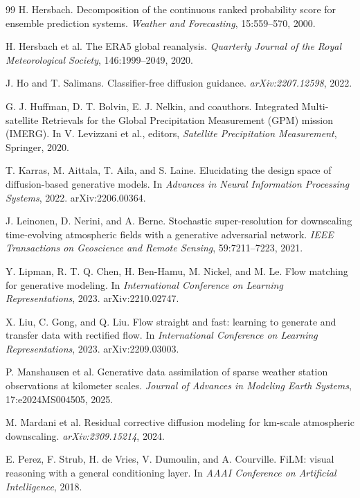 \documentclass[10pt,twocolumn]{article}
\begin{document}
\begin{thebibliography}{99}
H. Hersbach.
Decomposition of the continuous ranked probability score for ensemble prediction systems.
\emph{Weather and Forecasting}, 15:559--570, 2000.

H. Hersbach et al.
The ERA5 global reanalysis.
\emph{Quarterly Journal of the Royal Meteorological Society}, 146:1999--2049, 2020.

J. Ho and T. Salimans.
Classifier-free diffusion guidance.
\emph{arXiv:2207.12598}, 2022.

G. J. Huffman, D. T. Bolvin, E. J. Nelkin, and coauthors.
Integrated Multi-satellite Retrievals for the Global Precipitation Measurement (GPM) mission (IMERG).
In V. Levizzani et al., editors, \emph{Satellite Precipitation Measurement}, Springer, 2020.

T. Karras, M. Aittala, T. Aila, and S. Laine.
Elucidating the design space of diffusion-based generative models.
In \emph{Advances in Neural Information Processing Systems}, 2022.
arXiv:2206.00364.

J. Leinonen, D. Nerini, and A. Berne.
Stochastic super-resolution for downscaling time-evolving atmospheric fields with a generative adversarial network.
\emph{IEEE Transactions on Geoscience and Remote Sensing}, 59:7211--7223, 2021.

Y. Lipman, R. T. Q. Chen, H. Ben-Hamu, M. Nickel, and M. Le.
Flow matching for generative modeling.
In \emph{International Conference on Learning Representations}, 2023.
arXiv:2210.02747.

X. Liu, C. Gong, and Q. Liu.
Flow straight and fast: learning to generate and transfer data with rectified flow.
In \emph{International Conference on Learning Representations}, 2023.
arXiv:2209.03003.

P. Manshausen et al.
Generative data assimilation of sparse weather station observations at kilometer scales.
\emph{Journal of Advances in Modeling Earth Systems}, 17:e2024MS004505, 2025.

M. Mardani et al.
Residual corrective diffusion modeling for km-scale atmospheric downscaling.
\emph{arXiv:2309.15214}, 2024.

E. Perez, F. Strub, H. de Vries, V. Dumoulin, and A. Courville.
FiLM: visual reasoning with a general conditioning layer.
In \emph{AAAI Conference on Artificial Intelligence}, 2018.


\end{thebibliography}
\end{document}

